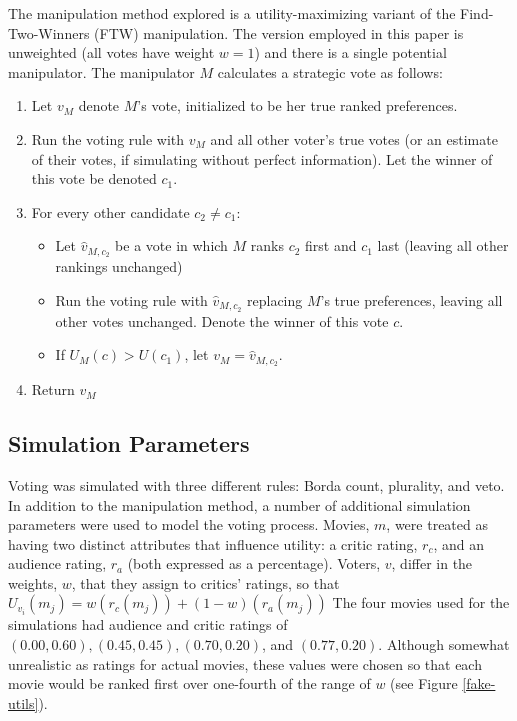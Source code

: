 \documentclass[12pt,letterpaper]{article} %
\begin{document}
The manipulation method explored is a utility-maximizing variant of the Find-Two-Winners (FTW) manipulation. The version employed in this paper is unweighted (all votes have weight $w=1$) and there is a single potential manipulator. The manipulator $M$ calculates a strategic vote as follows:
\begin{enumerate}
\item Let $v_M$ denote $M$'s vote, initialized to be her true ranked preferences.
\item Run the voting rule with $v_M$ and all other voter's true votes (or an estimate of their votes, if simulating without perfect information). Let the winner of this vote be denoted $c_1$.
\item For every other candidate $c_2 \neq c_1$:
  \begin{itemize}
    \item Let $\hat{v}_{M,c_2}$ be a vote in which $M$ ranks $c_2$ first and $c_1$ last (leaving all other rankings unchanged)
    \item Run the voting rule with $\hat{v}_{M,c_2}$ replacing $M$'s true preferences, leaving all other votes unchanged. Denote the winner of this vote $c$.
    \item If $U_M(c) > U(c_1)$, let $v_M=\hat{v}_{M,c_2}$.
  \end{itemize}
\item Return $v_M$
\end{enumerate}


\subsection{Simulation Parameters}

Voting was simulated with three different rules: Borda count, plurality, and veto. In addition to the manipulation method, a number of additional simulation parameters were used to model the voting process. Movies, $m$, were treated as having two distinct attributes that influence utility: a critic rating, $r_c$, and an audience rating, $r_a$ (both expressed as a percentage). Voters, $v$, differ in the weights, $w$, that they assign to critics' ratings, so that $U_{v_i}(m_j) = w(r_c(m_j)) + (1-w)(r_a(m_j))$ The four movies used for the simulations had audience and critic ratings of $(0.00, 0.60), (0.45, 0.45), (0.70, 0.20)$, and $(0.77, 0.20)$. Although somewhat unrealistic as ratings for actual movies, these values were chosen so that each movie would be ranked first over one-fourth of the range of $w$ (see Figure \ref{fake-utils}).
\end{document}
